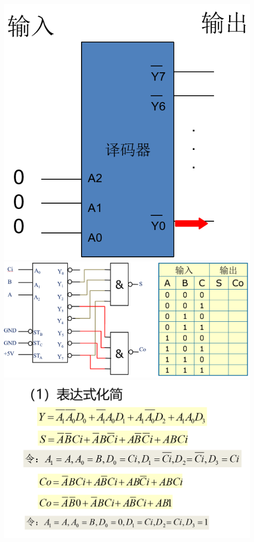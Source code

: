\documentclass[UTF8]{ctexart}
\begin{document}
\begin{enumerate}
\begin{itemize}
\begin{itemize}
                        \begin{center}
                            \includegraphics[scale=0.4]{7.png}
                            \label{fig:label}
                            \includegraphics[scale=0.3]{8.png}
                            \label{fig:label}
                            \includegraphics[scale=0.4]{11.png}

\end{center}
\end{itemize}
\end{itemize}
\end{enumerate}
\end{document}

